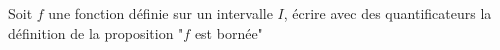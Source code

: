 Soit $f$ une fonction d\'{e}finie sur un intervalle $I$,
\'{e}crire avec des quantificateurs la d\'{e}finition de 
la proposition "$f$ est born\'{e}e" \bigskip \bigskip